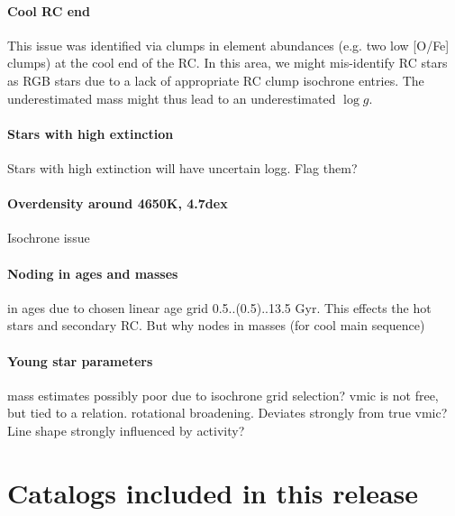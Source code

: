 \documentclass[fleqn,usenatbib,useAMS]{mnras}
\begin{document}
\paragraph*{Cool RC end} This issue was identified via clumps in element abundances (e.g. two low [O/Fe] clumps) at the cool end of the RC. In this area, we might mis-identify RC stars as RGB stars due to a lack of appropriate RC clump isochrone entries. The underestimated mass might thus lead to an underestimated $\log g$.

\paragraph*{Stars with high extinction} Stars with high extinction will have uncertain logg. Flag them?

\paragraph*{Overdensity around 4650K, 4.7dex} Isochrone issue

\paragraph*{Noding in ages and masses} in ages due to chosen linear age grid 0.5..(0.5)..13.5 Gyr. This effects the hot stars and secondary RC. But why nodes in masses (for cool main sequence)

\paragraph*{Young star parameters} mass estimates possibly poor due to isochrone grid selection? vmic is not free, but tied to a relation. rotational broadening. Deviates strongly from true vmic? Line shape strongly influenced by activity?

\section{Catalogs included in this release}  \label{sec:catalogs}

\end{document}
